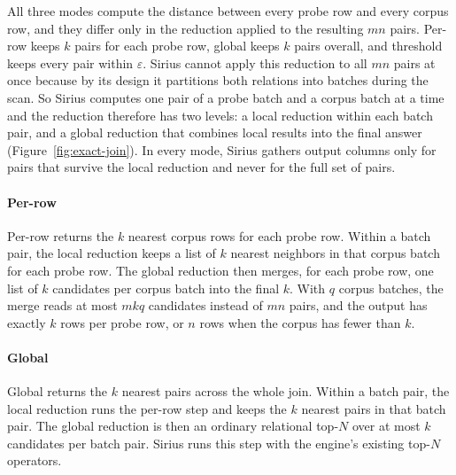



All three modes compute the distance between every probe row and every corpus row, and they differ only in the reduction applied to the resulting $mn$ pairs.
Per-row keeps $k$ pairs for each probe row, global keeps $k$ pairs overall, and threshold keeps every pair within $\varepsilon$.
Sirius cannot apply this reduction to all $mn$ pairs at once because by its design it partitions both relations into batches during the scan.
So Sirius computes one pair of a probe batch and a corpus batch at a time and the reduction therefore has two levels: a local reduction within each batch pair, and a global reduction that combines local results into the final answer (Figure~\ref{fig:exact-join}).
In every mode, Sirius gathers output columns only for pairs that survive the local reduction and never for the full set of pairs.

\paragraph{Per-row}
Per-row returns the $k$ nearest corpus rows for each probe row.
Within a batch pair, the local reduction keeps a list of $k$ nearest neighbors in that corpus batch for each probe row.
The global reduction then merges, for each probe row, one list of $k$ candidates per corpus batch into the final $k$.
With $q$ corpus batches, the merge reads at most $mkq$ candidates instead of $mn$ pairs, and the output has exactly $k$ rows per probe row, or $n$ rows when the corpus has fewer than $k$.

\paragraph{Global}
Global returns the $k$ nearest pairs across the whole join.
Within a batch pair, the local reduction runs the per-row step and keeps the $k$ nearest pairs in that batch pair.
The global reduction is then an ordinary relational top-$N$ over at most $k$ candidates per batch pair.
Sirius runs this step with the engine's existing top-$N$ operators.

